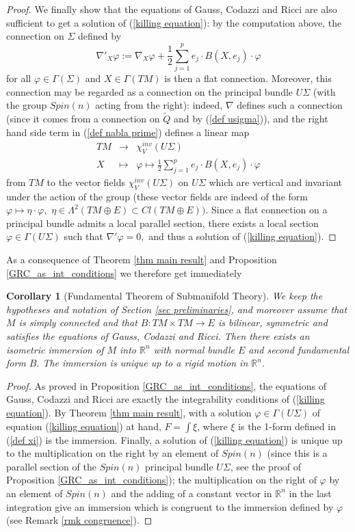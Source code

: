 \documentclass{amsart}
\newtheorem{cor}{Corollary}
\begin{document}
\begin{proof}
We finally show that the equations of Gauss, Codazzi and Ricci are also sufficient to get a solution of (\ref{killing equation}): by the computation above, the connection on $\Sigma$ defined by
\begin{equation}\label{def nabla prime}
\nabla'_X\varphi:=\nabla_X\varphi+\frac{1}{2}\sum_{j=1}^pe_j\cdot B(X,e_j)\cdot\varphi
\end{equation}
for all $\varphi\in\Gamma(\Sigma)$ and $X\in\Gamma(TM)$ is then a flat connection. Moreover, this connection may be regarded as a connection on the principal bundle $U\Sigma$ (with the group $Spin(n)$ acting from the right): indeed, $\nabla$ defines such a connection (since it comes from a connection on $\tilde{Q}$ and by (\ref{def usigma})), and the right hand side term in (\ref{def nabla prime}) defines a linear map
\begin{eqnarray*}
TM&\rightarrow&\chi^{inv}_V(U\Sigma)\\
X&\mapsto&\varphi\mapsto \frac{1}{2}\sum_{j=1}^pe_j\cdot B(X,e_j)\cdot\varphi
\end{eqnarray*}
from $TM$ to the vector fields $\chi^{inv}_V(U\Sigma)$ on $U\Sigma$ which are vertical and invariant under the action of the group (these vector fields are indeed of the form $\varphi\mapsto\eta\cdot\varphi,$ $\eta\in\Lambda^2(TM\oplus E)\subset Cl(TM\oplus E)).$ Since a flat connection on a principal bundle admits a local parallel section, there exists a local section $\varphi\in \Gamma(U\Sigma)$ such that $\nabla'\varphi=0,$ and thus a solution of (\ref{killing equation}).
\end{proof}
As a consequence of Theorem \ref{thm main result} and Proposition \ref{GRC_as_int_conditions} we therefore get immediately   
\begin{cor}[Fundamental Theorem of Submanifold Theory]
We keep the hypotheses and notation of Section \ref{sec preliminaries}, and moreover assume that $M$ is simply connected and that $B:TM\times TM\rightarrow E$ is bilinear, symmetric and satisfies the equations of Gauss, Codazzi and Ricci. Then there exists an isometric immersion of $M$ into ${\mathbb{R}}^n$ with normal bundle $E$ and second fundamental form $B.$ The immersion is unique up to a rigid motion in ${\mathbb{R}}^n.$
\end{cor} 
\begin{proof}
As proved in Proposition \ref{GRC_as_int_conditions}, the equations of Gauss, Codazzi and Ricci are exactly the integrability conditions of (\ref{killing equation}). By Theorem \ref{thm main result}, with a solution $\varphi\in \Gamma(U\Sigma)$ of equation (\ref{killing equation}) at hand, $F=\int\xi$, where $\xi$ is the 1-form defined in (\ref{def xi}) is the immersion. Finally, a solution of (\ref{killing equation}) is unique up to the multiplication on the right by an element of $Spin(n)$ (since this is a parallel section of the $Spin(n)$ principal bundle $U\Sigma$, see the proof of Proposition \ref{GRC_as_int_conditions}); the multiplication on the right of $\varphi$ by an element of $Spin(n)$ and the adding of a constant vector in ${\mathbb{R}}^n$ in the last integration give an immersion which is congruent to the immersion defined by $\varphi$ (see Remark \ref{rmk congruence}).
\end{proof}
\end{document}
